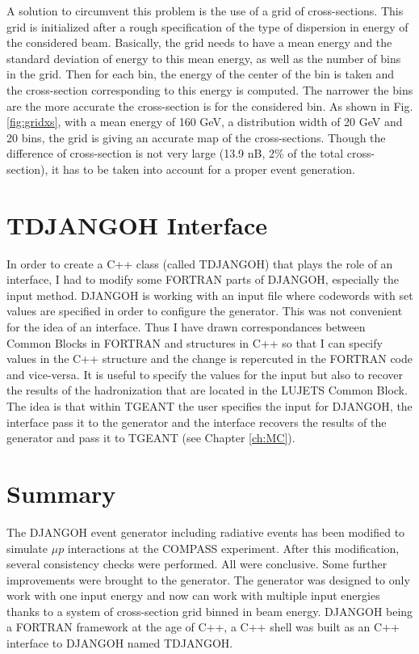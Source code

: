 A solution to circumvent this problem is the use
of a grid of cross-sections. This grid is initialized after a rough specification of the
type of dispersion in energy of the considered beam.
Basically, the grid needs to have
a mean energy and the standard deviation of energy to this mean energy, as well as the
number of bins in the grid. Then for each bin, the energy of the center of the bin is taken
and the cross-section corresponding to this energy is computed. The narrower the bins are
the more accurate the cross-section is for the considered bin. As shown in Fig. \ref{fig:gridxs}, with a
mean energy of 160 GeV, a distribution width of 20 GeV and 20 bins, the grid is giving an
accurate map of the cross-sections. Though the difference of cross-section is not very large (13.9 nB, 2\% of
the total cross-section), it has to be taken into account for a proper event generation.


\section{TDJANGOH Interface}

In order to create a C++ class (called TDJANGOH) that plays the role of an interface, I had to modify some FORTRAN parts of DJANGOH, especially the input method. DJANGOH is working with an input file where codewords with set values are specified in order to configure the generator. This was not convenient for the idea of an interface. Thus I have drawn correspondances between Common Blocks in FORTRAN and structures in C++ so that I can specify values in the C++ structure and the change is repercuted in the FORTRAN code and vice-versa. It is useful to specify the values for the input but also to recover the results of the hadronization that are located in the LUJETS Common Block. The idea is that within TGEANT the user specifies the input for DJANGOH, the interface pass it to the generator and the interface recovers the results of the generator and pass it to TGEANT (see Chapter \ref{ch:MC}).


\section{Summary}

The DJANGOH event generator including radiative events has been modified to simulate $\mu p$ interactions at the COMPASS experiment. After this modification, several consistency checks were performed. All were conclusive. Some further improvements were brought to the generator. The generator was designed to only work with one input energy and now can work with multiple input energies thanks to a system of cross-section grid binned in beam energy. DJANGOH being a FORTRAN framework at the age of C++, a C++ shell was built as an C++ interface to DJANGOH named TDJANGOH.
